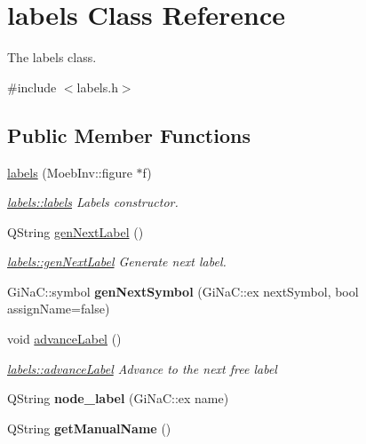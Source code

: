 \hypertarget{classlabels}{}\section{labels Class Reference}
\label{classlabels}


The labels class.  




{\ttfamily \#include $<$labels.\+h$>$}

\subsection*{Public Member Functions}
\begin{DoxyCompactItemize}
\item 
\mbox{\label{classlabels_a736d8b54b76c622c6ff937cd2cbdd767}} 
\mbox{\hyperlink{classlabels_a736d8b54b76c622c6ff937cd2cbdd767}{labels}} (Moeb\+Inv\+::figure $\ast$f)
\begin{DoxyCompactList}\small\item\em \mbox{\hyperlink{classlabels_a736d8b54b76c622c6ff937cd2cbdd767}{labels\+::labels}} Labels constructor. \end{DoxyCompactList}\item 
Q\+String \mbox{\hyperlink{classlabels_a70a7436dbef91e342fec4ec3130187e2}{gen\+Next\+Label}} ()
\begin{DoxyCompactList}\small\item\em \mbox{\hyperlink{classlabels_a70a7436dbef91e342fec4ec3130187e2}{labels\+::gen\+Next\+Label}} Generate next label. \end{DoxyCompactList}\item 
\mbox{\label{classlabels_aac459cce2911a18cf66175a6ccfb87f3}} 
Gi\+Na\+C\+::symbol {\bfseries gen\+Next\+Symbol} (Gi\+Na\+C\+::ex next\+Symbol, bool assign\+Name=false)
\item 
\mbox{\label{classlabels_a790344f0c86546b9b5fdda30dbe690a5}} 
void \mbox{\hyperlink{classlabels_a790344f0c86546b9b5fdda30dbe690a5}{advance\+Label}} ()
\begin{DoxyCompactList}\small\item\em \mbox{\hyperlink{classlabels_a790344f0c86546b9b5fdda30dbe690a5}{labels\+::advance\+Label}} Advance to the next free label \end{DoxyCompactList}\item 
\mbox{\label{classlabels_a87859b44a590675af2f05213e09e723e}} 
Q\+String {\bfseries node\+\_\+label} (Gi\+Na\+C\+::ex name)
\item 
\mbox{\label{classlabels_a629e15f96a5f73b4bfdb9b18b9b98092}} 
Q\+String {\bfseries get\+Manual\+Name} ()
\end{DoxyCompactItemize}
